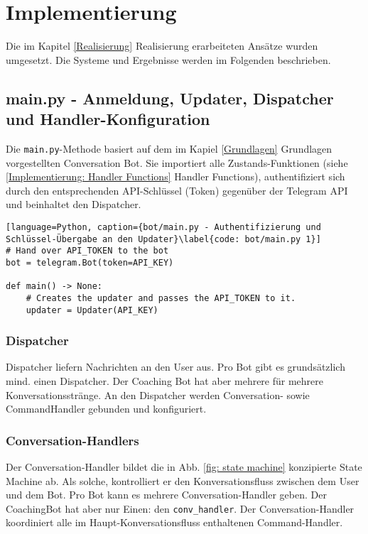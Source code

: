 \label{Implementierung}
\chapter{Implementierung}

    Die im Kapitel \ref*{Realisierung} Realisierung erarbeiteten Ansätze wurden umgesetzt. Die Systeme und Ergebnisse werden im Folgenden beschrieben.

    \section{main.py - Anmeldung, Updater, Dispatcher und Handler-Konfiguration} \label{main.py}
        Die \verb|main.py|-Methode basiert auf dem im Kapiel \ref*{Grundlagen} Grundlagen vorgestellten Conversation Bot. Sie importiert alle Zustands-Funktionen (siehe \ref*{Implementierung: Handler Functions} Handler Functions), authentifiziert sich durch den entsprechenden API-Schlüssel (Token) gegenüber der Telegram API und beinhaltet den Dispatcher. 
        
        \begin{lstlisting}[language=Python, caption={bot/main.py - Authentifizierung und Schlüssel-Übergabe an den Updater}\label{code: bot/main.py 1}]
# Hand over API_TOKEN to the bot
bot = telegram.Bot(token=API_KEY)

def main() -> None:
    # Creates the updater and passes the API_TOKEN to it.
    updater = Updater(API_KEY)
        \end{lstlisting}
        
        \subsection{Dispatcher} \label{Implementierung: Dispatcher}
            Dispatcher liefern Nachrichten an den User aus. Pro Bot gibt es grundsätzlich mind. einen Dispatcher. Der Coaching Bot hat aber mehrere für mehrere Konversationsstränge. An den Dispatcher werden Conversation- sowie CommandHandler gebunden und konfiguriert.
    
        \subsection{Conversation-Handlers} \label{Implementierung: Conversation-Handlers}
            Der Conversation-Handler bildet die in Abb. \ref*{fig: state machine} konzipierte State Machine ab. Als solche, kontrolliert er den Konversationsfluss zwischen dem User und dem Bot. Pro Bot kann es mehrere Conversation-Handler geben. Der CoachingBot hat aber nur Einen: den \verb|conv_handler|. Der Conversation-Handler koordiniert alle im Haupt-Konversationsfluss enthaltenen Command-Handler.
    
